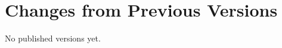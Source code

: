 \documentclass[10pt,a4paper]{ivoa}
\begin{document}
\appendix
\section{Changes from Previous Versions}

No published versions yet.



\end{document}
